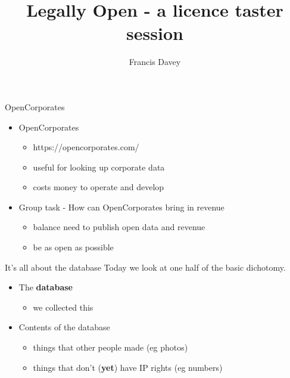 \documentclass{beamer}
\title{Legally Open - a licence taster session}
\author{Francis Davey}
\begin{document}
\begin{frame}
  \titlepage
\end{frame}

\begin{frame}{OpenCorporates}
  \begin{itemize}
  \item OpenCorporates
    \begin{itemize}
    \item https://opencorporates.com/
    \item useful for looking up corporate data
    \item costs money to operate and develop
    \end{itemize}
  \item Group task - How can OpenCorporates bring in revenue
    \begin{itemize}
    \item balance need to publish open data and revenue
    \item be as open as possible
    \end{itemize}
  \end{itemize}

\end{frame}

\begin{frame}{It's all about the database}
Today we look at one half of the basic dichotomy.
  \begin{itemize}
  \item The {\bf database}
    \begin{itemize}
    \item we collected this
    \end{itemize}
  \item Contents of the database
    \begin{itemize}
    \item things that other people made (eg photos)
    \item things that don't ({\bf yet}) have IP rights (eg numbers)
    \end{itemize}
  \end{itemize}
\end{frame}
\end{document}
